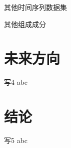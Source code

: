 \documentclass{libs/format}
\begin{document}
\begin{frame}{其他时间序列数据集}
  
\end{frame}

\begin{frame}{其他组成成分}
  
\end{frame}

\section{未来方向}

\begin{frame}{写4}
  abc
\end{frame}

\section{结论}

\begin{frame}{写5}
  abc
\end{frame}

\begin{frame}
    \printbibliography[title = {参考文献}]
\end{frame}
\end{document}
